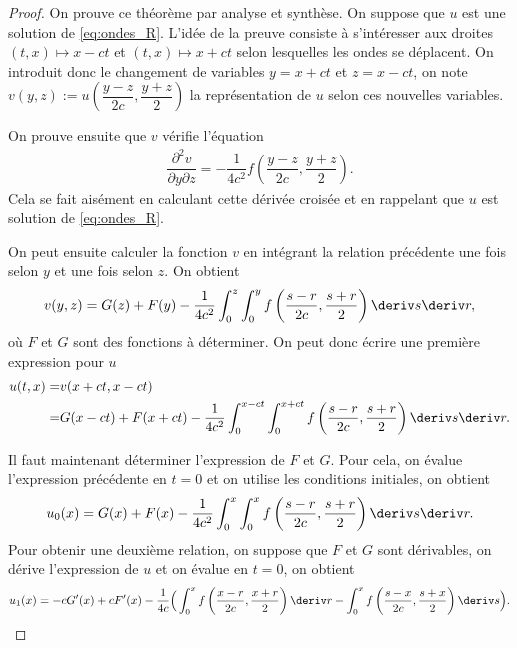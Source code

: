 \documentclass[12pt,a4paper,twoside]{article}
\begin{document}
\begin{proof}
  On prouve ce th\'eor\`eme par analyse et synth\`ese.
  On suppose que $u$ est une solution de \eqref{eq:ondes_R}.
  L'id\'ee de la preuve consiste \`a s'int\'eresser aux droites $(t,x) \mapsto x-ct$
  et $(t,x) \mapsto x+ct$ selon lesquelles les ondes se d\'eplacent.
  On introduit donc le changement de variables $y = x+ct$ et $z = x-ct$,
  on note $v(y,z) := u\left(\dfrac{y-z}{2c} , \dfrac{y+z}{2}\right)$ la repr\'esentation
  de $u$ selon ces nouvelles variables.

  On prouve ensuite que $v$ v\'erifie l'\'equation
  \begin{align*}
    \dfrac{\partial^2 v}{\partial y \partial z}
    = - \dfrac{1}{4 c^2} f\left(\dfrac{y-z}{2c} , \dfrac{y+z}{2} \right) .
  \end{align*}
  Cela se fait ais\'ement en calculant cette d\'eriv\'ee crois\'ee et en rappelant que $u$ 
  est solution de \eqref{eq:ondes_R}.

  On peut ensuite calculer la fonction $v$ en int\'egrant la relation pr\'ec\'edente
  une fois selon $y$ et une fois selon $z$.
  On obtient
  \begin{align*}
    v(y,z) = G(z) + F(y)
    - \dfrac{1}{4c^2} \int_0^z \int_0^y f \left(\dfrac{s-r}{2c} , \dfrac{s+r}{2} \right)
    \deriv s \deriv r ,
  \end{align*}
  o\`u $F$ et $G$ sont des fonctions \`a d\'eterminer.
  On peut donc \'ecrire une premi\`ere expression pour $u$
  \begin{align*}
    u(t,x) 
    =& v(x+ct,x-ct)
    \\
    =& G(x-ct) + F(x+ct)
       - \dfrac{1}{4c^2} \int_{0}^{x-ct} \int_0^{x+ct} f\left(\dfrac{s-r}{2c} , \dfrac{s+r}{2}\right) 
       \deriv s \deriv r .
  \end{align*}

  Il faut maintenant d\'eterminer l'expression de $F$ et $G$.
  Pour cela, on \'evalue l'expression pr\'ec\'edente en $t=0$ et on utilise
  les conditions initiales, on obtient
  \begin{align}
    \label{eq:proof_DAlembert_u0}
    u_0(x) = G(x) + F(x)
    - \dfrac{1}{4c^2} \int_{0}^{x} \int_0^{x} f\left(\dfrac{s-r}{2c} , \dfrac{s+r}{2}\right)
    \deriv s \deriv r .
  \end{align}
  Pour obtenir une deuxi\`eme relation, on suppose que $F$ et $G$ sont
  d\'erivables, on d\'erive l'expression de $u$ et on \'evalue en $t=0$,
  on obtient
  \begin{align}
    \label{eq:proof_DAlembert_u1}
    u_1(x) = - c G'(x) + c F'(x) - \dfrac{1}{4c} \Big( 
    \int_{0}^x f\left(\dfrac{x-r}{2c},\dfrac{x+r}{2}\right) \deriv r
    - \int_0^x f\left(\dfrac{s-x}{2c},\dfrac{s+x}{2}\right) \deriv s
    \Big) .
  \end{align}


\end{proof}
\end{document}
